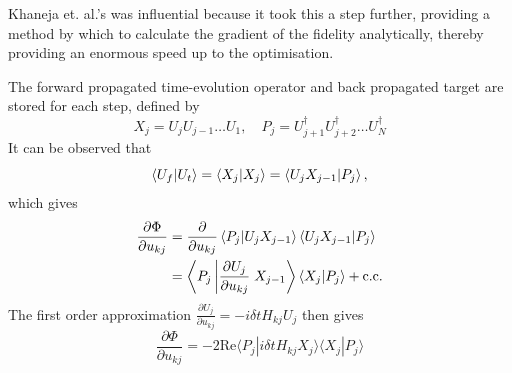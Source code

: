 \documentclass[../Thesis.tex]{subfiles}
\begin{document}
Khaneja et. al.'s was influential because it took this a step further, providing a method by which to calculate the gradient of the fidelity analytically, thereby providing an enormous speed up to the optimisation.

The forward propagated time-evolution operator and back propagated target are stored for each step, defined by
\begin{equation}
    X_j = U_jU_{j-1} \dots U_1,\quad P_j = U_{j+1}^\dagger U_{j+2}^\dagger\dots U_N^\dagger
\end{equation}
It can be observed that 
\begin{equation}
    \bra{U_f}\ket{U_t} = \bra{X_j}\ket{X_j} = \bra{U_j X_{j-1}}\ket{P_j},
\end{equation}
which gives
\begin{align}
    \frac{\partial\Phi}{\partial u_{kj}} &= \frac{\partial}{\partial u_{kj}} \bra{P_j}\ket{U_jX_{j-1}}\bra{U_jX_{j-1}}\ket{P_j}\\
    &= \left\langle P_j\left|\frac{\partial U_j}{\partial u_{kj}}\right. X_{j-1}\right\rangle\bra{X_j}\ket{P_j} + \text{c.c.}
\end{align}
The first order approximation $\frac{\partial U_j}{\partial u_{kj}} = -i\delta t H_{kj}U_j$ then gives
\begin{equation}
      \frac{\partial\Phi}{\partial u_{kj}} = -2\text{Re}\langle P_j | i\delta tH_{kj} X_j\rangle \langle X_j | P_j\rangle
\end{equation}
\end{document}
